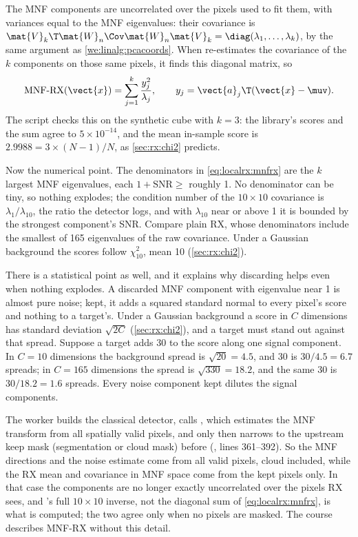 The MNF components are uncorrelated over the pixels used to fit them, with variances equal to the MNF
eigenvalues: their covariance is $\mat{V}_k\T\mat{W}_n\Cov\mat{W}_n\mat{V}_k = \diag(\lambda_1, \dots,
\lambda_k)$, by the same argument as \cref{we:linalg:pcacoords}. When  re-estimates the
covariance of the $k$ components on those same pixels, it finds this diagonal matrix, so
\begin{equation}\label{eq:localrx:mnfrx}
\text{MNF-RX}(\vect{x}) = \sum_{j=1}^{k}\frac{y_j^2}{\lambda_j},
\qquad y_j = \vect{a}_j\T(\vect{x} - \muv).
\end{equation}
The script checks this on the synthetic cube with $k = 3$: the library's scores and the sum agree to
$5\times10^{-14}$, and the mean in-sample score is $2.9988 = 3\times(N-1)/N$\tagC, as
\cref{sec:rx:chi2} predicts.

Now the numerical point. The denominators in \cref{eq:localrx:mnfrx} are the $k$ largest MNF
eigenvalues, each $1 + \text{SNR} \ge$ roughly 1. No denominator can be tiny, so nothing explodes; the
condition number of the $10\times10$ covariance is $\lambda_1/\lambda_{10}$, the ratio the detector
logs, and with $\lambda_{10}$ near or above 1 it is bounded by the strongest component's SNR. Compare
plain RX, whose denominators include the smallest of 165 eigenvalues of the raw covariance. Under a
Gaussian background the scores follow $\chi^2_{10}$, mean 10 (\cref{sec:rx:chi2}).

There is a statistical point as well, and it explains why discarding helps even when nothing
explodes. A discarded MNF component with eigenvalue near 1 is almost pure noise; kept, it adds a
squared standard normal to every pixel's score and nothing to a target's. Under a Gaussian background a
score in $C$ dimensions has standard deviation $\sqrt{2C}$ (\cref{sec:rx:chi2}), and a target must stand
out against that spread. Suppose a target adds 30 to the score along one signal component. In $C = 10$
dimensions the background spread is $\sqrt{20} = 4.5$, and 30 is $30/4.5 = 6.7$ spreads; in $C = 165$
dimensions the spread is $\sqrt{330} = 18.2$, and the same 30 is $30/18.2 = 1.6$ spreads. Every noise
component kept dilutes the signal components.

\begin{sourcenote}
The worker builds the classical detector, calls , which estimates the MNF
transform from all spatially valid pixels, and only then narrows  to the
upstream keep mask (segmentation or cloud mask) before 
(, lines 361--392). So the MNF directions
and the noise estimate come from all valid pixels, cloud included, while the RX mean and covariance in
MNF space come from the kept pixels only. In that case the components are no longer exactly
uncorrelated over the pixels RX sees, and 's full $10\times10$ inverse, not the
diagonal sum of \cref{eq:localrx:mnfrx}, is what is computed; the two agree only when no pixels are
masked. The course describes MNF-RX without this detail.
\end{sourcenote}

